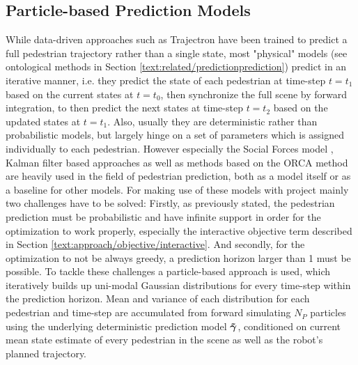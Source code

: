 \subsection{Particle-based Prediction Models} 
\label{text:exp_particles}
While data-driven approaches such as Trajectron \cite{Ivanovic2018} have been trained to predict a full pedestrian trajectory rather than a single state, most "physical" models (see ontological methods in Section \ref{text:related/predictionprediction}) predict in an iterative manner, i.e. they predict the state of each pedestrian at time-step $t = t_1$ based on the current states at $t = t_0$, then synchronize the full scene by forward integration, to then predict the next states at time-step $t = t_2$ based on the updated states at $t = t_1$. Also, usually they are deterministic rather than probabilistic models, but largely hinge on a set of parameters which is assigned individually to each pedestrian. However especially the Social Forces model \cite{Helbing1995}, Kalman filter based approaches \cite{Schneider2013}\cite{Rehder2015}\cite{Guo2016} as well as methods based on the \ac{ORCA} method \cite{vandenBerg2011}\cite{Luo2018a}\cite{Charlton2019} are heavily used in the field of pedestrian prediction, both as a model itself or as a baseline for other models. 
\newline
For making use of these models with project \project mainly two challenges have to be solved: Firstly, as previously stated, the pedestrian prediction must be probabilistic and have infinite support in order for the optimization to work properly, especially the interactive objective term described in Section \ref{text:approach/objective/interactive}. And secondly, for the optimization to not be always greedy, a prediction horizon larger than 1 must be possible. 
\newline
To tackle these challenges a particle-based approach is used, which iteratively builds up uni-modal Gaussian distributions for every time-step within the prediction horizon. Mean and variance of each distribution for each pedestrian and time-step are accumulated from forward simulating $N_P$ particles using the underlying deterministic prediction model $\distmodeldet[]$, conditioned on current mean state estimate of every pedestrian in the scene as well as the robot's planned trajectory. 

